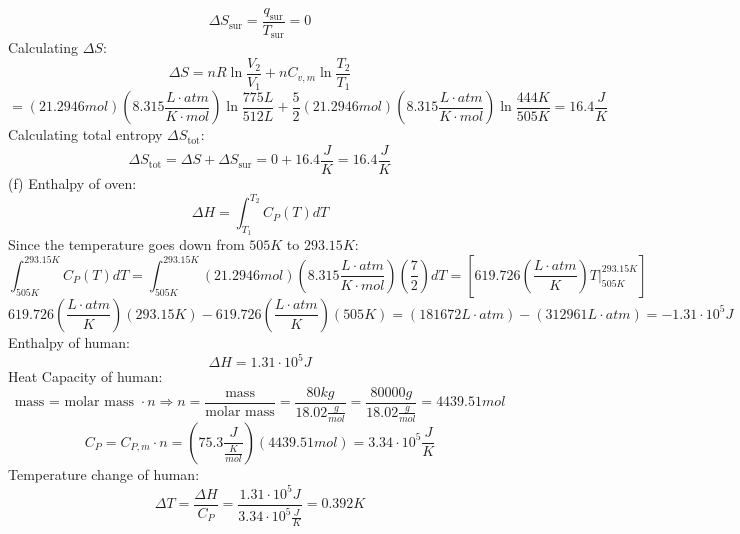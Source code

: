 \documentclass[11pt]{article}
\begin{document}
\[\Delta S_{\text{sur}}=\frac{q_{\text{sur}}}{T_{\text{sur}}}=0\]
Calculating $\Delta S$:
\[\Delta S=nR\ln{\frac{V_2}{V_1}+nC_{v,m}\ln{\frac{T_2}{T_1}}}\]
\[=(21.2946mol)(8.315 \frac{L\cdot atm}{K\cdot mol})\ln{\frac{775L}{512L}}+\frac{5}{2}(21.2946mol)(8.315 \frac{L\cdot atm}{K\cdot mol})\ln{\frac{444K}{505K}}=16.4 \frac{J}{K}\]
Calculating total entropy $\Delta S_{\text{tot}}$:
\[\Delta S_{\text{tot}}=\Delta S+\Delta S_{\text{sur}}=0+16.4\frac{J}{K}=16.4\frac{J}{K}\]
\newpage
(f) Enthalpy of oven:
\[\Delta H=\int^{T_2}_{T_1}C_P(T)dT\]
Since the temperature goes down from $505K$ to $293.15K$:
\[\int^{293.15K}_{505K}C_P(T)dT=\int^{293.15K}_{505K}(21.2946 mol)(8.315\frac{L\cdot atm}{K\cdot mol})(\frac{7}{2})dT=[619.726(\frac{L\cdot atm}{K})T |^{293.15K}_{505K}]\]
\[619.726(\frac{L\cdot atm}{K})(293.15K)-619.726(\frac{L\cdot atm}{K})(505K)=(181672L\cdot atm)-(312961L\cdot atm)=-1.31\cdot10^5J\]
Enthalpy of human:
\[\Delta H= 1.31\cdot10^5J\]
Heat Capacity of human:
\[\text{mass = molar mass }\cdot n \Rightarrow n=\frac{\text{mass}}{\text{molar mass}}=\frac{80kg}{18.02\frac{g}{mol}}=\frac{80000g}{18.02\frac{g}{mol}}=4439.51 mol\]
\[C_P=C_{P,m}\cdot n=(75.3 \frac{J}{\frac{K}{mol}})(4439.51mol)=3.34\cdot10^5\frac{J}{K}\]
Temperature change of human:
\[\Delta T=\frac{\Delta H}{C_P}=\frac{1.31\cdot10^5J}{3.34\cdot10^5\frac{J}{K}}=0.392K\]

\newpage
\end{document}
